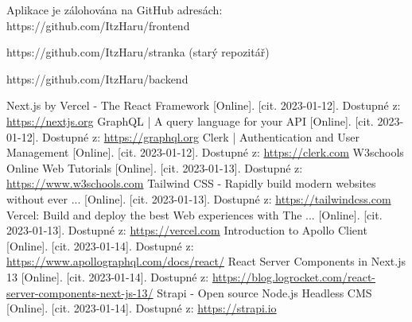 \documentclass[12pt, a4paper,
oneside,      %
openright
]{report}
\let\oldchapter\chapter
\renewcommand{\chapter}{
	\clearpage %
	\pagestyle{plain} %
	\oldchapter	
}
\begin{document}
	Aplikace je zálohována na GitHub adresách: https://github.com/ItzHaru/frontend
	
	https://github.com/ItzHaru/stranka (starý repozitář)
	
	https://github.com/ItzHaru/backend
	
	\renewcommand{\bibname}{Seznam použitých zdrojů}
	\begin{thebibliography}{99}
		Next.js by Vercel - The React Framework [Online]. [cit. 2023-01-12]. Dostupné z: \url{https://nextjs.org}
		GraphQL | A query language for your API [Online]. [cit. 2023-01-12]. Dostupné z: \url{https://graphql.org}
		Clerk | Authentication and User Management [Online]. [cit. 2023-01-12]. Dostupné z: \url{https://clerk.com}
		W3schools Online Web Tutorials [Online]. [cit. 2023-01-13]. Dostupné z: \url{https://www.w3schools.com}
		Tailwind CSS - Rapidly build modern websites without ever ... [Online]. [cit. 2023-01-13]. Dostupné z: \url{https://tailwindcss.com}
		Vercel: Build and deploy the best Web experiences with The ... [Online]. [cit. 2023-01-13]. Dostupné z: \url{https://vercel.com}
		Introduction to Apollo Client [Online]. [cit. 2023-01-14]. Dostupné z: \url{https://www.apollographql.com/docs/react/}
		React Server Components in Next.js 13 [Online]. [cit. 2023-01-14]. Dostupné z: \url{https://blog.logrocket.com/react-server-components-next-js-13/}
		Strapi - Open source Node.js Headless CMS
		 [Online]. [cit. 2023-01-14]. Dostupné z: \url{https://strapi.io}
	\end{thebibliography}
	
	\listoffigures
	
	\appendix %
	
	\titleformat{\chapter}[block]{\scshape\bfseries\LARGE}{Příloha \thechapter}{10pt}{\vspace{0pt}}[\vspace{-22pt}] %
	
	
\end{document}
